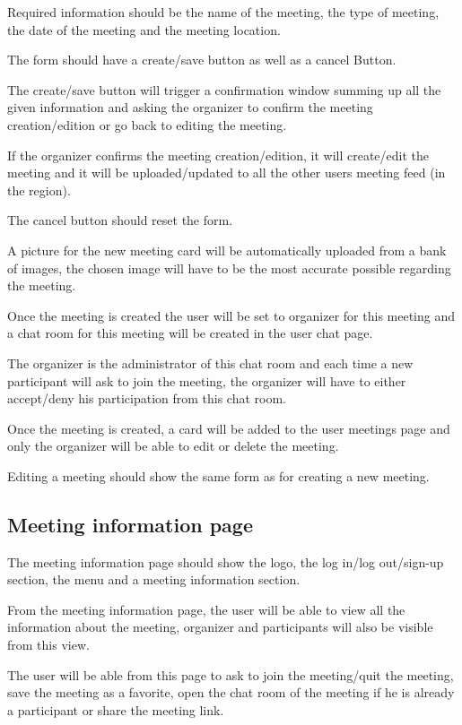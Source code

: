 \documentclass[conference]{IEEEtran}
\begin{document}
Required information should be the name of the meeting, the type of meeting, the date of the meeting and the meeting location.

The form should have a create/save button as well as a cancel Button. 

The create/save button will trigger a confirmation window summing up all the given information and asking the organizer to confirm the meeting creation/edition or go back to editing the meeting. 

If the organizer confirms the meeting creation/edition, it will create/edit the meeting and it will be uploaded/updated to all the other users meeting feed (in the region). 

The cancel button should reset the form.

A picture for the new meeting card will be automatically uploaded from a bank of images, the chosen image will have to be the most accurate possible regarding the meeting.

Once the meeting is created the user will be set to organizer for this meeting and a chat room for this meeting will be created in the user chat page. 

The organizer is the administrator of this chat room and each time a new participant will ask to join the meeting, the organizer will have to either accept/deny his participation from this chat room.

Once the meeting is created, a card will be added to the user meetings page and only the organizer will be able to edit or delete the meeting.

Editing a meeting should show the same form as for creating a new meeting.

\subsection{Meeting information page}

The meeting information page should show the logo, the log in/log out/sign-up section, the menu and a meeting information section.

From the meeting information page, the user will be able to view all the information about the meeting, organizer and participants will also be visible from this view.

The user will be able from this page to ask to join the meeting/quit the meeting, save the meeting as a favorite, open the chat room of the meeting if he is already a participant or share the meeting link.
\end{document}
